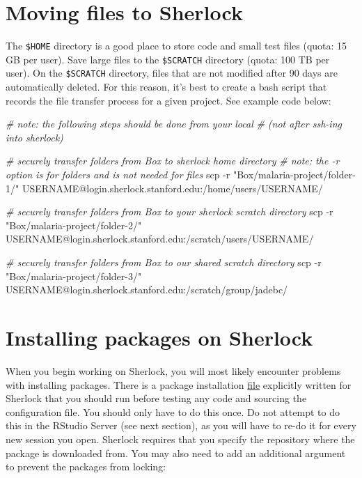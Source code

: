 \documentclass[
]{book}
\newenvironment{Shaded}{\begin{snugshade}}{\end{snugshade}}
\newcommand{\AttributeTok}[1]{\textcolor[rgb]{0.77,0.63,0.00}{#1}}
\newcommand{\CommentTok}[1]{\textcolor[rgb]{0.56,0.35,0.01}{\textit{#1}}}
\newcommand{\FunctionTok}[1]{\textcolor[rgb]{0.00,0.00,0.00}{#1}}
\newcommand{\NormalTok}[1]{#1}
\newcommand{\StringTok}[1]{\textcolor[rgb]{0.31,0.60,0.02}{#1}}
\begin{document}
\hypertarget{moving-files-to-sherlock}{%
\section{Moving files to Sherlock}\label{moving-files-to-sherlock}}

The \texttt{\$HOME} directory is a good place to store code and small test files (quota: 15 GB per user). Save large files to the \texttt{\$SCRATCH} directory (quota: 100 TB per user). On the \texttt{\$SCRATCH} directory, files that are not modified after 90 days are automatically deleted. For this reason, it's best to create a bash script that records the file transfer process for a given project. See example code below:

\begin{Shaded}
\begin{Highlighting}[]
\CommentTok{\# note: the following steps should be done from your local }
\CommentTok{\# (not after ssh{-}ing into sherlock)}

\CommentTok{\# securely transfer folders from Box to sherlock home directory}
\CommentTok{\# note: the {-}r option is for folders and is not needed for files}
\FunctionTok{scp} \AttributeTok{{-}r} \StringTok{"Box/malaria{-}project/folder{-}1/"}\NormalTok{ USERNAME@login.sherlock.stanford.edu:/home/users/USERNAME/}

\CommentTok{\# securely transfer folders from Box to your sherlock scratch directory}
\FunctionTok{scp} \AttributeTok{{-}r} \StringTok{"Box/malaria{-}project/folder{-}2/"}\NormalTok{ USERNAME@login.sherlock.stanford.edu:/scratch/users/USERNAME/}

\CommentTok{\# securely transfer folders from Box to our shared scratch directory}
\FunctionTok{scp} \AttributeTok{{-}r} \StringTok{"Box/malaria{-}project/folder{-}3/"}\NormalTok{ USERNAME@login.sherlock.stanford.edu:/scratch/group/jadebc/}
\end{Highlighting}
\end{Shaded}

\hypertarget{installing-packages-on-sherlock}{%
\section{Installing packages on Sherlock}\label{installing-packages-on-sherlock}}

When you begin working on Sherlock, you will most likely encounter problems with installing packages. There is a package installation \href{https://drive.google.com/file/d/1eybh4j_G-r3pMZBCVA4QHoWZBo_cW5zb/view}{file} explicitly written for Sherlock that you should run before testing any code and sourcing the configuration file. You should only have to do this once. Do not attempt to do this in the RStudio Server (see next section), as you will have to re-do it for every new session you open. Sherlock requires that you specify the repository where the package is downloaded from. You may also need to add an additional argument to prevent the packages from locking:
\end{document}
